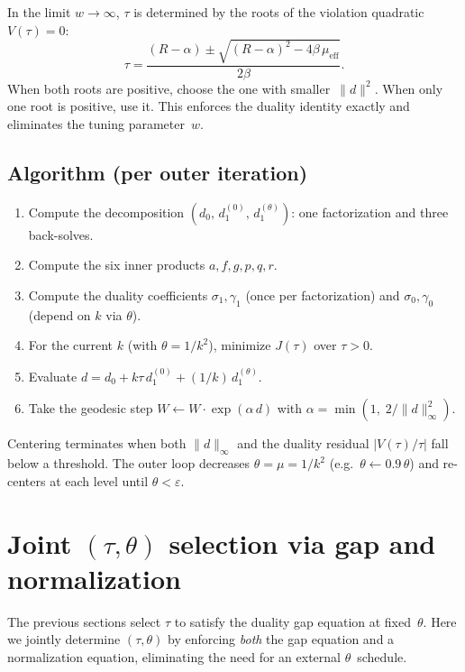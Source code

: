 \documentclass{article}
\begin{document}
In the limit $w \to \infty$, $\tau$ is determined by the roots of the
violation quadratic $V(\tau) = 0$:
\[
  \boxed{\tau = \frac{(R - \alpha) \pm \sqrt{(R-\alpha)^2 - 4\beta\,\mu_{\mathrm{eff}}}}
                     {2\beta}.}
\]
When both roots are positive, choose the one with smaller~$\|d\|^2$.
When only one root is positive, use it.  This enforces the duality
identity exactly and eliminates the tuning parameter~$w$.



\subsection{Algorithm (per outer iteration)}

\begin{enumerate}
  \item Compute the decomposition $(d_0,\, d_1^{(0)},\, d_1^{(\theta)})$:
        one factorization and three back-solves.
  \item Compute the six inner products $a, f, g, p, q, r$.
  \item Compute the duality coefficients $\sigma_1, \gamma_1$
        (once per factorization) and $\sigma_0, \gamma_0$
        (depend on $k$ via $\theta$).
  \item For the current $k$ (with $\theta = 1/k^2$), minimize
        $J(\tau)$ over $\tau > 0$.
  \item Evaluate $d = d_0 + k\tau\,d_1^{(0)} + (1/k)\,d_1^{(\theta)}$.
  \item Take the geodesic step $W \leftarrow W \cdot \exp(\alpha\,d)$
        with $\alpha = \min(1,\; 2/\|d\|_\infty^2)$.
\end{enumerate}

Centering terminates when both $\|d\|_\infty$ and the duality residual
$|V(\tau)/\tau|$ fall below a threshold.  The outer loop decreases
$\theta = \mu = 1/k^2$ (e.g.\ $\theta \leftarrow 0.9\,\theta$) and
re-centers at each level until $\theta < \varepsilon$.


\section{Joint $(\tau, \theta)$ selection via gap and normalization}

The previous sections select $\tau$ to satisfy the duality gap equation at
fixed~$\theta$.  Here we jointly determine $(\tau, \theta)$ by enforcing
\emph{both} the gap equation and a normalization equation, eliminating the
need for an external $\theta$~schedule.
\end{document}
